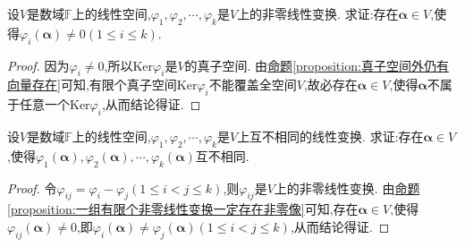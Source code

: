 \documentclass[../../main.tex]{subfiles}%
\begin{document}
\begin{proposition}\label{proposition:一组有限个非零线性变换一定存在非零像}
设\(V\)是数域\(\mathbb{F}\)上的线性空间,\(\varphi_1,\varphi_2,\cdots,\varphi_k\)是\(V\)上的非零线性变换. 求证:存在\(\boldsymbol{\alpha}\in V\),使得\(\varphi_i(\boldsymbol{\alpha})\neq 0(1\leqslant  i\leqslant  k)\).
\end{proposition}
\begin{proof}

因为\(\varphi_i\neq 0\),所以\(\text{Ker}\varphi_i\)是\(V\)的真子空间. 由\hyperref[proposition:真子空间外仍有向量存在]{命题\ref{proposition:真子空间外仍有向量存在}}可知,有限个真子空间\(\text{Ker}\varphi_i\)不能覆盖全空间\(V\),故必存在\(\boldsymbol{\alpha}\in V\),使得\(\boldsymbol{\alpha}\)不属于任意一个\(\text{Ker}\varphi_i\),从而结论得证.

\end{proof}

\begin{proposition}\label{proposition:一组有限个非零线性变换一定存在互不相同的像}
设\(V\)是数域\(\mathbb{F}\)上的线性空间,\(\varphi_1,\varphi_2,\cdots,\varphi_k\)是\(V\)上互不相同的线性变换. 求证:存在\(\boldsymbol{\alpha}\in V\),使得\(\varphi_1(\boldsymbol{\alpha}),\varphi_2(\boldsymbol{\alpha}),\cdots,\varphi_k(\boldsymbol{\alpha})\)互不相同.
\end{proposition}
\begin{proof}

令\(\varphi_{ij}=\varphi_i - \varphi_j(1\leqslant  i<j\leqslant  k)\),则\(\varphi_{ij}\)是\(V\)上的非零线性变换. 由\hyperref[proposition:一组有限个非零线性变换一定存在非零像]{命题\ref{proposition:一组有限个非零线性变换一定存在非零像}}可知,存在\(\boldsymbol{\alpha}\in V\),使得\(\varphi_{ij}(\boldsymbol{\alpha})\neq 0\),即\(\varphi_i(\boldsymbol{\alpha})\neq\varphi_j(\boldsymbol{\alpha})(1\leqslant  i<j\leqslant  k)\),从而结论得证. 

\end{proof}
\end{document}
